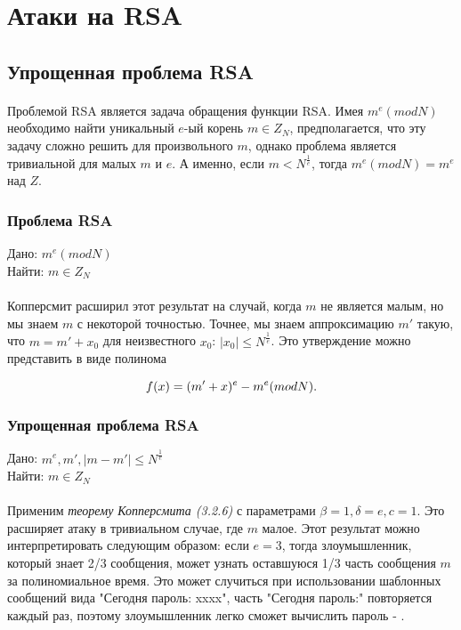 
\section{Атаки на RSA}

\subsection{Упрощенная проблема RSA}

\paragraph{} Проблемой RSA является задача обращения функции RSA. Имея {$m^e (mod N)$} необходимо найти уникальный {$e$}-ый корень {$m \in Z_N$}, 
  предполагается, что эту задачу сложно решить для произвольного {$m$}, однако проблема является тривиальной для малых {$m$} и {$e$}. А именно, если
  {$m < N^\frac{1}{e}$}, тогда {$m^e (mod N) = m^e$} над {$Z$}.
  
  \subsubsection{Проблема RSA}
  Дано: {$m^e (mod N)$} \\   
  Найти: {$m \in Z_N$}
  
\paragraph{} Копперсмит расширил этот результат на случай, когда {$m$} не является малым, но мы знаем {$m$} с некоторой точностью. Точнее, мы знаем аппроксимацию
  {$m'$} такую, что {$m = m' + x_0$} для неизвестного {$x_0$}: {$|x_0| \le N^\frac{1}{e}$}. Это утверждение можно представить в виде полинома
  
    \begin{equation}
     \textit{{$ f(x) = (m' + x)^e - m^e (mod N) $}}.
    \end{equation}
    
  \subsubsection{Упрощенная проблема RSA}
  Дано: {$m^e, m', |m-m'| \le N^\frac{1}{e}$} \\   
  Найти: {$m \in Z_N$}  
  
\paragraph{} Применим \textit{теорему Копперсмита (3.2.6)} с параметрами {$\beta = 1, \delta = e, c = 1$}. Это расширяет атаку в тривиальном случае, где {$m$} малое. Этот
  результат можно интерпретировать следующим образом: если {$e = 3$}, тогда злоумышленник, который знает 2/3 сообщения, может узнать оставшуюся
  1/3 часть сообщения {$m$} за полиномиальное время. Это может случиться при использовании шаблонных сообщений вида "Сегодня пароль: xxxx", часть 
  "Сегодня пароль:" повторяется каждый раз, поэтому злоумышленник легко сможет вычислить пароль - \cite[страницы 328-329]{may10}.

